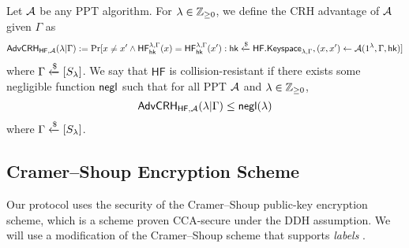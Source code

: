 Let $\mathcal{A}$ be any PPT algorithm. For $\lambda\in\mathbb{Z}_{\geq 0}$, we define the CRH advantage of $\mathcal{A}$ given $\Gamma$ as $$\mathsf{AdvCRH}_{\mathsf{HF},\mathcal{A}}(\lambda | \Gamma):=\Pr[x\neq x'\wedge\mathsf{HF}_{\mathsf{hk}}^{\lambda,\Gamma}(x)=\mathsf{HF}_{\mathsf{hk}}^{\lambda,\Gamma}(x'): \mathsf{hk}\xleftarrow{\$}\mathsf{HF.Keyspace}_{\lambda,\Gamma}, (x,x')\gets\mathcal{A}(1^\lambda,\Gamma,\mathsf{hk})]$$
where $\Gamma\xleftarrow{\$}[S_\lambda]$. We say that $\mathsf{HF}$ is collision-resistant if there exists some negligible function $\mathsf{negl}$ such that for all PPT $\mathcal{A}$ and $\lambda\in\mathbb{Z}_{\geq 0}$, $$\mathsf{AdvCRH}_{\mathsf{HF},\mathcal{A}}(\lambda|\Gamma)\leq\mathsf{negl}(\lambda)$$ where $\Gamma\xleftarrow{\$}[S_\lambda]$.

\subsection{Cramer--Shoup Encryption Scheme}

Our protocol uses the security of the Cramer--Shoup public-key encryption scheme, which is a scheme proven CCA-secure under the DDH assumption. We will use a modification of the Cramer--Shoup scheme that supports \textit{labels} \cite{EC:KatOstYun01, iso}.

